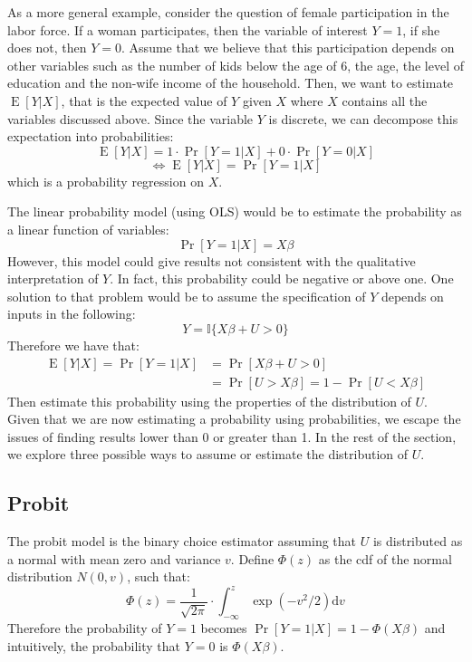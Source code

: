 \documentclass[12pt]{report}
\def\D{\mathrm{d}}
\newcommand{\E}[1]{\operatorname{E}\left[#1\right]}
\def\D{\mathrm{d}}
\newcommand{\Prob}[1]{\operatorname{Pr}\left[#1\right]}
\def\D{\mathrm{d}}
\begin{document}
As a more general example, consider the question of female participation in the labor force. If a woman participates, then the variable of interest $Y=1$, if she does not, then $Y=0$. Assume that we believe that this participation depends on other variables such as the number of kids below the age of 6, the age, the level of education and the non-wife income of the household. Then, we want to estimate $\E{Y\vert X}$, that is the expected value of $Y$ given $X$ where $X$ contains all the variables discussed above. Since the variable $Y$ is discrete, we can decompose this expectation into probabilities: $$\E{Y\vert X} = 1\cdot \Prob{Y = 1\vert X} + 0 \cdot \Prob{Y = 0\vert X} $$ $$\Leftrightarrow \E{Y\vert X} = \Prob{Y = 1\vert X} $$ which is a probability regression on $X$.

The linear probability model (using OLS) would be to estimate the probability as a linear function of variables: $$\Prob{Y = 1\vert X} = X\beta $$ However, this model could give results not consistent with the qualitative interpretation of $Y$. In fact, this probability could be negative or above one. One solution to that problem would be to assume the specification of $Y$ depends on inputs in the following: $$Y = \mathbb{I}\{X\beta + U > 0\} $$ Therefore we have that:\begin{align*}
\E{Y\vert X} = \Prob{Y = 1\vert X} & = \Prob{X\beta + U > 0}\\
& = \Prob{U > X\beta} = 1 -  \Prob{U < X\beta}
\end{align*}
Then estimate this probability using the properties of the distribution of $U$. Given that we are now estimating a probability using probabilities, we escape the issues of finding results lower than 0 or greater than 1. In the rest of the section, we explore three possible ways to assume or estimate the distribution of $U$.

\subsection{Probit}

The probit model is the binary choice estimator assuming that $U$ is distributed as a normal with mean zero and variance $v$. Define $\Phi(z)$ as the cdf of the normal distribution $N(0, v)$, such that: $$\Phi(z) = \frac{1}{\sqrt{2\pi}}\cdot\int_{-\infty}^{z}\exp(-v^2/2)\D v $$
Therefore the probability of $Y=1$ becomes $\Prob{Y = 1\vert X} =  1 - \Phi(X\beta)$ and intuitively, the probability that $Y=0$ is $\Phi(X\beta)$.
\end{document}
